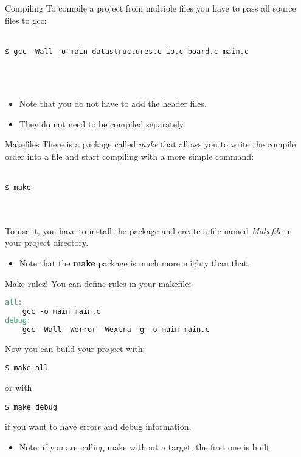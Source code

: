 \subsection{}
\begin{frame}[fragile]{Compiling}
	To compile a project from multiple files you have to pass all source files to gcc:\\\ \\
	\begin{lstlisting}[numbers=none]
$ gcc -Wall -o main datastructures.c io.c board.c main.c
\end{lstlisting}\ \\\ \\
	\begin{itemize}
		\item Note that you do not have to add the header files.
		\item They do not need to be compiled separately.
	\end{itemize}
\end{frame}

\begin{frame}[fragile]{Makefiles}
	There is a package called \textit{make} that allows you to write the compile order into a file and start compiling with a more simple command:\\\ \\
	\begin{lstlisting}[numbers=none]
$ make
\end{lstlisting}\ \\\ \\
	To use it, you have to install the package and create a file named \textit{Makefile} in your project directory.\\
	\begin{itemize}
		\item Note that the \textbf{make} package is much more mighty than that.
	\end{itemize}
\end{frame}

\begin{frame}[fragile]{Make rulez!}
	You can define rules in your makefile:
	\begin{lstlisting}[language=make,basicstyle=\scriptsize,numbers=none]
all:
	gcc -o main main.c
debug:
	gcc -Wall -Werror -Wextra -g -o main main.c
\end{lstlisting}
	Now you can build your project with:
	\begin{lstlisting}[basicstyle=\scriptsize,numbers=none]
$ make all
\end{lstlisting}
	or with
	\begin{lstlisting}[basicstyle=\scriptsize,numbers=none]
$ make debug
\end{lstlisting}
	if you want to have errors and debug information.
	\begin{itemize}
		\item Note: if you are calling make without a target, the first one is built.
	\end{itemize}
\end{frame}

